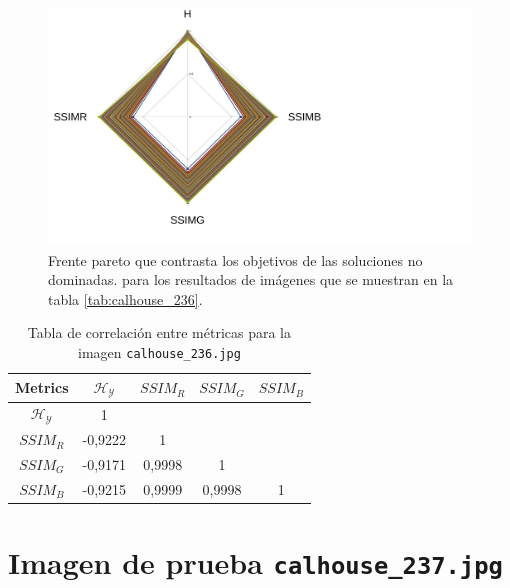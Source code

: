     \begin{figure}[H]
    \centering
    \includegraphics[width=\textwidth]{./Figures/calhouse_236/calhouse_236_2.jpg}
    \caption{Frente pareto que contrasta los objetivos de las soluciones no dominadas. para los resultados de imágenes que se muestran en la tabla \ref{tab:calhouse_236}.}
    \label{fig:calhouse2362fp}
    \end{figure}

\begin{table}[H]
\setlength{\abovecaptionskip}{2pt plus 3pt minus 2pt} %
\caption[Parámetros de entrada para $MOPSO$]{Tabla de correlación entre métricas para la imagen \texttt{calhouse\_236.jpg}}
\begin{center}
 \begin{tabular}{||c | c c c c||} 
 \hline
Metrics & $\mathscr{H_Y}$ & $SSIM_R$ & $SSIM_G$ & $SSIM_B$ \\ 
\hline
$\mathscr{H_Y}$ & 1 &  &  & \\ 
\hline
$SSIM_R$ & -0,9222 & 1 &  \\ 
\hline
$SSIM_G$ & -0,9171 & 0,9998  & 1  & \\ 
\hline
$SSIM_B$ & -0,9215 & 0,9999  & 0,9998  & 1 \\ 
\hline
\end{tabular}
\end{center}
\label{table:correlacion}
\end{table}



\section{Imagen de prueba \texttt{calhouse\_237.jpg}}

